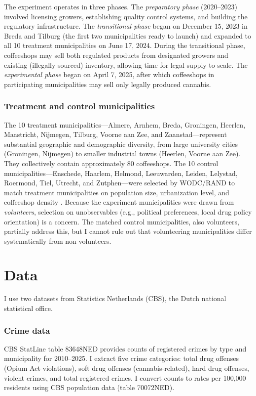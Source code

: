 \documentclass[12pt]{article}
\begin{document}
The experiment operates in three phases. The \textit{preparatory phase} (2020--2023) involved licensing growers, establishing quality control systems, and building the regulatory infrastructure. The \textit{transitional phase} began on December 15, 2023 in Breda and Tilburg (the first two municipalities ready to launch) and expanded to all 10 treatment municipalities on June 17, 2024. During the transitional phase, coffeeshops may sell both regulated products from designated growers and existing (illegally sourced) inventory, allowing time for legal supply to scale. The \textit{experimental phase} began on April 7, 2025, after which coffeeshops in participating municipalities may sell only legally produced cannabis.

\subsubsection*{Treatment and control municipalities} The 10 treatment municipalities---Almere, Arnhem, Breda, Groningen, Heerlen, Maastricht, Nijmegen, Tilburg, Voorne aan Zee, and Zaanstad---represent substantial geographic and demographic diversity, from large university cities (Groningen, Nijmegen) to smaller industrial towns (Heerlen, Voorne aan Zee). They collectively contain approximately 80 coffeeshops. The 10 control municipalities---Enschede, Haarlem, Helmond, Leeuwarden, Leiden, Lelystad, Roermond, Tiel, Utrecht, and Zutphen---were selected by WODC/RAND to match treatment municipalities on population size, urbanization level, and coffeeshop density \citep{rand2024baseline}. Because the experiment municipalities were drawn from \textit{volunteers}, selection on unobservables (e.g., political preferences, local drug policy orientation) is a concern. The matched control municipalities, also volunteers, partially address this, but I cannot rule out that volunteering municipalities differ systematically from non-volunteers.


\section{Data}

I use two datasets from Statistics Netherlands (CBS), the Dutch national statistical office.

\subsubsection*{Crime data} CBS StatLine table 83648NED provides counts of registered crimes by type and municipality for 2010--2025. I extract five crime categories: total drug offenses (Opium Act violations), soft drug offenses (cannabis-related), hard drug offenses, violent crimes, and total registered crimes. I convert counts to rates per 100,000 residents using CBS population data (table 70072NED).
\end{document}
